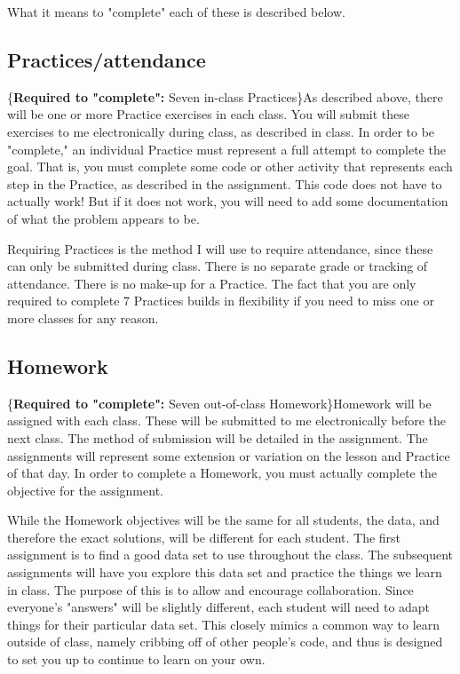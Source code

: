 \documentclass{tufte-handout}
\begin{document}
What it means to "complete" each of these is described below.
\subsection*{Practices/attendance}
\label{sec:orgheadline7}
\marginnote\{\textbf{Required to "complete":} Seven in-class Practices\}As described above, there will be one or more Practice exercises in each class. You will submit these exercises to me electronically during class, as described in class.  In order to be "complete," an individual Practice must represent a full attempt to complete the goal.  That is, you must complete some code or other activity that represents each step in the Practice, as described in the assignment.  This code does not have to actually work!  But if it does not work, you will need to add some documentation of what the problem appears to be.

Requiring Practices is the method I will use to require attendance, since these can only be submitted during class.  There is no separate grade or tracking of attendance.  There is no make-up for a Practice.  The fact that you are only required to complete 7 Practices builds in flexibility if you need to miss one or more classes for any reason. 

\subsection*{Homework}
\label{sec:orgheadline8}
\marginnote\{\textbf{Required to "complete":} Seven out-of-class Homework\}Homework will be assigned with each class.  These will be submitted to me electronically before the next class.  The method of submission will be detailed in the assignment. The assignments will represent some extension or variation on the lesson and Practice of that day.  In order to complete a Homework, you must actually complete the objective for the assignment.  

While the Homework objectives will be the same for all students, the data, and therefore the exact solutions, will be different for each student.  The first assignment is to find a good data set to use throughout the class.  The subsequent assignments will have you explore this data set and practice the things we learn in class.  The purpose of this is to allow and encourage collaboration.  Since everyone's "answers" will be slightly different, each student will need to adapt things for their particular data set.  This closely mimics a common way to learn outside of class, namely cribbing off of other people's code, and thus is designed to set you up to continue to learn on your own.
\end{document}
